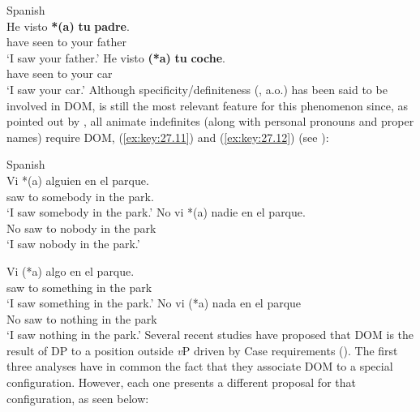 \documentclass[output=paper]{langsci/langscibook}
\begin{document}
\ea\label{ex:key:27.10} Spanish\\
    \ea
        \gll He     visto \textbf{*(a)} \textbf{tu} \textbf{padre}.\\
            have  seen   to   your   father\\
        \glt `I saw your father.'
    \ex
        \gll He     visto \textbf{(*a)} \textbf{tu} \textbf{coche}.\\
            have  seen     to  your car\\
        \glt `I saw your car.'
    \z
\z
Although specificity/definiteness (\citealt{Leonetti2004,Lopez2012}, a.o.) has
been said to be involved in DOM, 
is still the most relevant feature for this phenomenon since, as pointed out by
\citet{Rodriguez-Mondonedo2007}, all animate indefinites (along with personal
pronouns and proper names) require DOM,
(\ref{ex:key:27.11}) and (\ref{ex:key:27.12}) (see
\citealt{Rodriguez-Mondonedo2007}):

\ea\label{ex:key:27.11} Spanish\\
    \ea
        \gll Vi *(a) alguien en el parque.\\
        saw \hphantom{*(}to somebody in the park.\\
        \glt `I saw somebody in the park.'
    \ex No vi *(a) nadie en el parque.\\
            No saw \hphantom{*(}to nobody in the park\\
        \glt `I saw nobody in the park.'
    \z
\z\newpage

\ea\label{ex:key:27.12} 
    \ea
        \gll Vi (*a) algo en el parque.\\
               saw \hphantom{*(}to something in the park\\
        \glt `I saw something in the park.'
    \ex
        \gll No vi (*a) nada en el parque\\
            No saw \hphantom{*(}to nothing in the park\\
        \glt `I saw nothing in the park.'
    \z
\z
Several recent studies have proposed that DOM
is the result of DP  to a position outside \emph{v}P driven by Case
requirements (\citealt{Torrego1998,
Rodriguez-Mondonedo2007,Lopez2012,OrmazabalRomero2013,Zdrojewski2013,OrdonezRoca2017}).
The first three analyses have in common the fact that they associate
\gls{DOM} to a special configuration. However, each
one presents a different proposal for that configuration, as seen
below:
\end{document}
